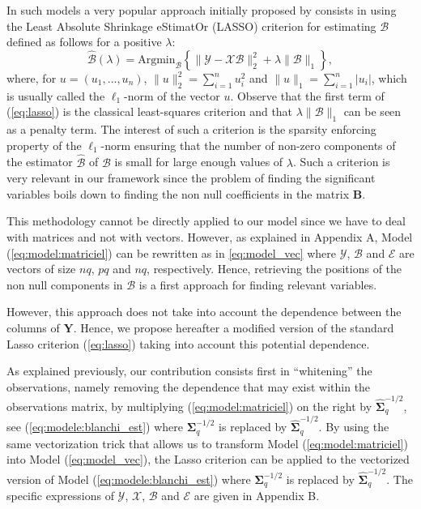 In such models a very popular approach initially proposed by \cite{Tib96} consists in using the Least Absolute
Shrinkage eStimatOr (LASSO) criterion for estimating $\mathcal{B}$ defined as follows for a positive $\lambda$:
\begin{equation}\label{eq:lasso}
\widehat{\mathcal{B}}(\lambda)=\textrm{Argmin}_\mathcal{B}\left\{\|\mathcal{Y}-\mathcal{X}\mathcal{B}\|_2^2+\lambda\|\mathcal{B}\|_1\right\},
\end{equation}
where, for $u=(u_1,\dots,u_n)$, $\|u\|_2^2=\sum_{i=1}^n u_i^2$ and $\|u\|_1=\sum_{i=1}^n |u_i|$, which is usually called the $\ell_1$-norm of the vector $u$. Observe that the first term of (\ref{eq:lasso})
is the classical least-squares criterion and that $\lambda\|\mathcal{B}\|_1$ can be seen as a penalty term. The interest of such
a criterion is the sparsity enforcing property of the  $\ell_1$-norm ensuring that the number of non-zero components of the estimator 
$\widehat{\mathcal{B}}$ of $\mathcal{B}$ is small for large enough values
of $\lambda$.
Such a criterion is very relevant in our framework since the problem of finding the significant variables
boils down to finding the non null coefficients in the matrix
$\boldsymbol{B}$.

This methodology cannot be directly applied to our model since we have
to deal with  matrices and not with vectors. However,  as explained in
Appendix A,  Model (\ref{eq:model:matriciel})  can be rewritten  as in
\eqref{eq:model_vec}    where    $\mathcal{Y}$,   $\mathcal{B}$    and
$\mathcal{E}$   are  vectors   of  size   $nq$,  $pq$   and  $nq$,
respectively.  Hence,  retrieving  the   positions  of  the  non  null
components in $\mathcal{B}$  is a first approach  for finding relevant
variables.

However, this approach does not take into account the dependence between the columns of 
$\boldsymbol{Y}$. Hence,
we propose hereafter a modified version of the standard Lasso criterion (\ref{eq:lasso}) taking into account this potential dependence.

As explained previously, our contribution consists first in ``whitening'' the observations, namely removing the dependence that may exist within the observations
matrix, by multiplying (\ref{eq:model:matriciel}) on the right by
$\widehat{\boldsymbol{\Sigma}}_q^{-1/2}$, see
(\ref{eq:modele:blanchi_est}) where $\boldsymbol{\Sigma}_q^{-1/2}$ is
replaced by $\widehat{\boldsymbol{\Sigma}}_q^{-1/2}$. 
By using the same vectorization trick that allows us to transform Model (\ref{eq:model:matriciel}) into Model (\ref{eq:model_vec}),
the Lasso criterion can be applied to the vectorized version of Model
(\ref{eq:modele:blanchi_est}) where $\boldsymbol{\Sigma}_q^{-1/2}$ is
replaced by $\widehat{\boldsymbol{\Sigma}}_q^{-1/2}$.
The specific expressions of $\mathcal{Y}$, $\mathcal{X}$, $\mathcal{B}$ and $\mathcal{E}$ are given in Appendix B.

